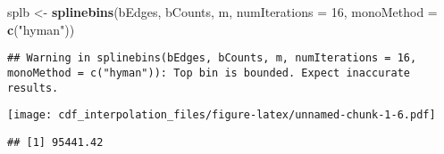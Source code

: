 \documentclass[]{article}
\newenvironment{Shaded}{\begin{snugshade}}{\end{snugshade}}
\newcommand{\CommentTok}[1]{\textcolor[rgb]{0.56,0.35,0.01}{\textit{#1}}}
\newcommand{\ControlFlowTok}[1]{\textcolor[rgb]{0.13,0.29,0.53}{\textbf{#1}}}
\newcommand{\DataTypeTok}[1]{\textcolor[rgb]{0.13,0.29,0.53}{#1}}
\newcommand{\DecValTok}[1]{\textcolor[rgb]{0.00,0.00,0.81}{#1}}
\newcommand{\KeywordTok}[1]{\textcolor[rgb]{0.13,0.29,0.53}{\textbf{#1}}}
\newcommand{\NormalTok}[1]{#1}
\newcommand{\OperatorTok}[1]{\textcolor[rgb]{0.81,0.36,0.00}{\textbf{#1}}}
\newcommand{\StringTok}[1]{\textcolor[rgb]{0.31,0.60,0.02}{#1}}
\begin{document}
\begin{Shaded}
\begin{Highlighting}[]
\NormalTok{splb <-}\StringTok{ }\KeywordTok{splinebins}\NormalTok{(bEdges, bCounts, m, }\DataTypeTok{numIterations =} \DecValTok{16}\NormalTok{, }\DataTypeTok{monoMethod =} \KeywordTok{c}\NormalTok{(}\StringTok{"hyman"}\NormalTok{))}
\end{Highlighting}
\end{Shaded}

\begin{verbatim}
## Warning in splinebins(bEdges, bCounts, m, numIterations = 16, monoMethod = c("hyman")): Top bin is bounded. Expect inaccurate results.
\end{verbatim}

\begin{Shaded}
\end{Shaded}

\texttt{[image: cdf\_interpolation\_files/figure-latex/unnamed-chunk-1-6.pdf]}

\begin{Shaded}
\end{Shaded}

\begin{verbatim}
## [1] 95441.42
\end{verbatim}

\begin{Shaded}
\end{Shaded}
\end{document}
